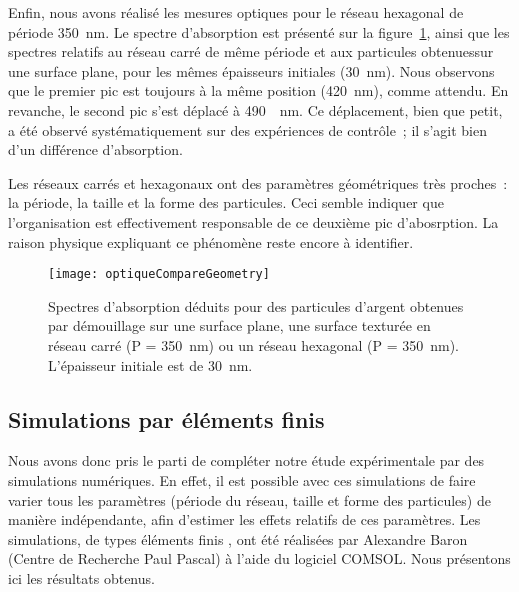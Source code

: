 Enfin, nous avons réalisé les mesures optiques pour le réseau hexagonal de période 350~nm. Le spectre d'absorption est présenté sur la figure~\ref{optiqueCompareGeometry}, ainsi que les spectres relatifs au réseau carré de même période et aux particules obtenuessur une surface plane, pour les mêmes épaisseurs initiales (30~nm). Nous observons que le premier pic est toujours à la même position (420~nm), comme attendu. En revanche, le second pic s'est déplacé à 490~~nm. Ce déplacement, bien que petit, a été observé systématiquement sur des expériences de contrôle~; il s'agit bien d'un différence d'absorption.\par 
Les réseaux carrés et hexagonaux ont des paramètres géométriques très proches~: la période, la taille et la forme des particules. Ceci semble indiquer que l'organisation est effectivement responsable de ce deuxième pic d'abosrption. La raison physique expliquant ce phénomène reste encore à identifier.\par 

\begin{figure}[!htb]
\centering
\texttt{[image: optiqueCompareGeometry]}
\caption{Spectres d'absorption déduits pour des particules d'argent obtenues par démouillage sur une surface plane, une surface texturée en réseau carré (P = 350~nm) ou un réseau hexagonal (P = 350~nm). L'épaisseur initiale est de 30~nm.}
\label{optiqueCompareGeometry}
\end{figure}

\subsection{Simulations par éléments finis}
Nous avons donc pris le parti de compléter notre étude expérimentale par des simulations numériques. En effet, il est possible avec ces simulations de faire varier tous les paramètres (période du réseau, taille et forme des particules) de manière indépendante, afin d'estimer les effets relatifs de ces paramètres. Les simulations, de types \og éléments finis \fg, ont été réalisées par Alexandre Baron (Centre de Recherche Paul Pascal) à l'aide du logiciel COMSOL. Nous présentons ici les résultats obtenus.\par 
